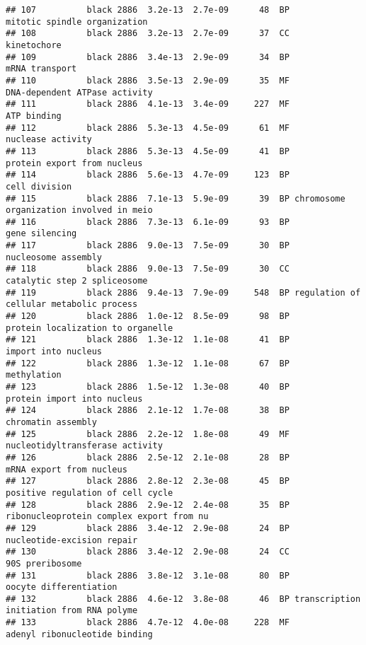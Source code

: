 \documentclass[]{article}
\begin{document}
\begin{verbatim}
## 107          black 2886  3.2e-13  2.7e-09      48  BP             mitotic spindle organization
## 108          black 2886  3.2e-13  2.7e-09      37  CC                              kinetochore
## 109          black 2886  3.4e-13  2.9e-09      34  BP                           mRNA transport
## 110          black 2886  3.5e-13  2.9e-09      35  MF            DNA-dependent ATPase activity
## 111          black 2886  4.1e-13  3.4e-09     227  MF                              ATP binding
## 112          black 2886  5.3e-13  4.5e-09      61  MF                        nuclease activity
## 113          black 2886  5.3e-13  4.5e-09      41  BP              protein export from nucleus
## 114          black 2886  5.6e-13  4.7e-09     123  BP                            cell division
## 115          black 2886  7.1e-13  5.9e-09      39  BP chromosome organization involved in meio
## 116          black 2886  7.3e-13  6.1e-09      93  BP                           gene silencing
## 117          black 2886  9.0e-13  7.5e-09      30  BP                      nucleosome assembly
## 118          black 2886  9.0e-13  7.5e-09      30  CC             catalytic step 2 spliceosome
## 119          black 2886  9.4e-13  7.9e-09     548  BP regulation of cellular metabolic process
## 120          black 2886  1.0e-12  8.5e-09      98  BP        protein localization to organelle
## 121          black 2886  1.3e-12  1.1e-08      41  BP                      import into nucleus
## 122          black 2886  1.3e-12  1.1e-08      67  BP                              methylation
## 123          black 2886  1.5e-12  1.3e-08      40  BP              protein import into nucleus
## 124          black 2886  2.1e-12  1.7e-08      38  BP                       chromatin assembly
## 125          black 2886  2.2e-12  1.8e-08      49  MF          nucleotidyltransferase activity
## 126          black 2886  2.5e-12  2.1e-08      28  BP                 mRNA export from nucleus
## 127          black 2886  2.8e-12  2.3e-08      45  BP        positive regulation of cell cycle
## 128          black 2886  2.9e-12  2.4e-08      35  BP ribonucleoprotein complex export from nu
## 129          black 2886  3.4e-12  2.9e-08      24  BP               nucleotide-excision repair
## 130          black 2886  3.4e-12  2.9e-08      24  CC                          90S preribosome
## 131          black 2886  3.8e-12  3.1e-08      80  BP                   oocyte differentiation
## 132          black 2886  4.6e-12  3.8e-08      46  BP transcription initiation from RNA polyme
## 133          black 2886  4.7e-12  4.0e-08     228  MF            adenyl ribonucleotide binding

\end{verbatim}
\end{document}
